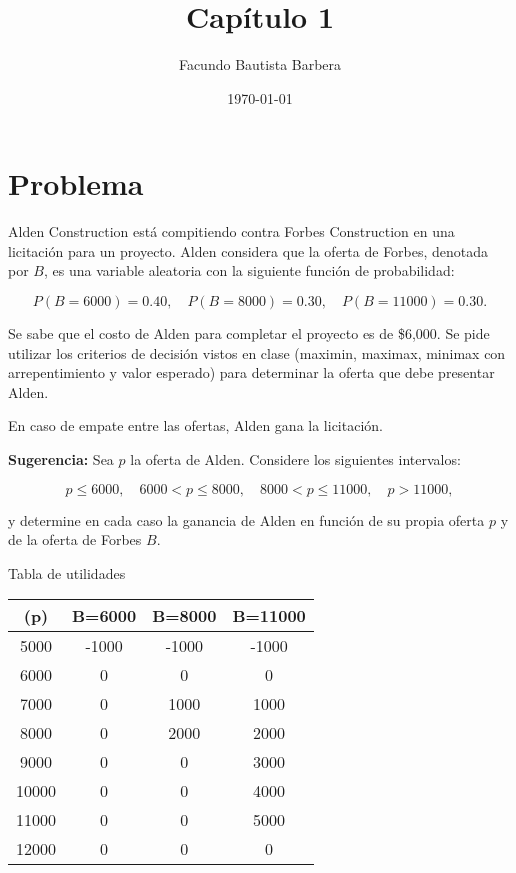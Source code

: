 \documentclass{article}
\title{Capítulo 1}
\author{Facundo Bautista Barbera}
\date{\today}
\begin{document}
\maketitle

\section*{Problema}

Alden Construction está compitiendo contra Forbes Construction en una licitación para un proyecto. Alden considera que la oferta de Forbes, denotada por $B$, es una variable aleatoria con la siguiente función de probabilidad:

$$
	P(B = 6000) = 0.40,\quad
	P(B = 8000) = 0.30,\quad
	P(B = 11000) = 0.30.
$$

Se sabe que el costo de Alden para completar el proyecto es de \$6{,}000. Se pide
utilizar los criterios de decisión vistos en clase (maximin, maximax, minimax con
arrepentimiento y valor esperado) para determinar la oferta que debe presentar Alden.

En caso de empate entre las ofertas, Alden gana la licitación.

\textbf{Sugerencia:} Sea $p$ la oferta de Alden. Considere los siguientes intervalos:

\[
	p \leq 6000,\quad
	6000 < p \leq 8000,\quad
	8000 < p \leq 11000,\quad
	p > 11000,
\]

y determine en cada caso la ganancia de Alden en función de su propia oferta $p$ y de la oferta de Forbes $B$.

\newpage

Tabla de utilidades

\begin{tabular}{c|ccc}
	\text{Oferta de Alden } (p) & B=6000 & B=8000 & B=11000 \\
	\hline
	5000                        & -1000  & -1000  & -1000   \\
	6000                        & 0      & 0      & 0       \\
	7000                        & 0      & 1000   & 1000    \\
	8000                        & 0      & 2000   & 2000    \\
	9000                        & 0      & 0      & 3000    \\
	10000                       & 0      & 0      & 4000    \\
	11000                       & 0      & 0      & 5000    \\
	12000                       & 0      & 0      & 0       \\
\end{tabular}
\end{document}
